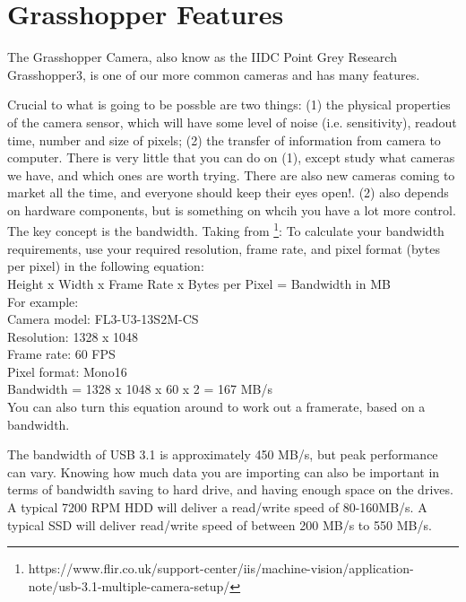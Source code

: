 \documentclass{report}
\begin{document}
\newpage

\section{Grasshopper Features}\label{Grasshopper Features}

The Grasshopper Camera, also know as the IIDC Point Grey Research Grasshopper3, is one of our more common cameras and has many features.


Crucial to what is going to be possble are two things: (1) the physical properties of the camera sensor, which will have some level of noise (i.e. sensitivity), readout time, number and size of pixels;   (2) the transfer of information from camera to computer.   There is very little that you can do on (1), except study what cameras we have, and which ones are worth trying. There are also new cameras coming to market all the time, and everyone should keep their eyes open!.   (2) also depends on hardware components, but is something on whcih you have a lot more control.   The key concept is the bandwidth.  Taking from \footnote{https://www.flir.co.uk/support-center/iis/machine-vision/application-note/usb-3.1-multiple-camera-setup/}: To calculate your bandwidth requirements, use your required resolution, frame rate, and pixel format (bytes per pixel) in the following equation:\\
Height x Width x Frame Rate x Bytes per Pixel = Bandwidth in MB\\

For example:\\
Camera model: FL3-U3-13S2M-CS\\
Resolution: 1328 x 1048\\
Frame rate: 60 FPS\\
Pixel format: Mono16\\
Bandwidth = 1328 x 1048 x 60 x 2 = 167 MB/s\\

You can also turn this equation around to work out a framerate, based on a bandwidth.

The  bandwidth of  USB 3.1  is approximately 450 MB/s, but peak performance can vary.   Knowing how much data you are importing can also be important in terms of bandwidth saving to hard drive, and having enough space on the drives. A typical 7200 RPM HDD will deliver a read/write speed of 80-160MB/s. A typical SSD will deliver read/write speed of between 200 MB/s to 550 MB/s.
\end{document}
